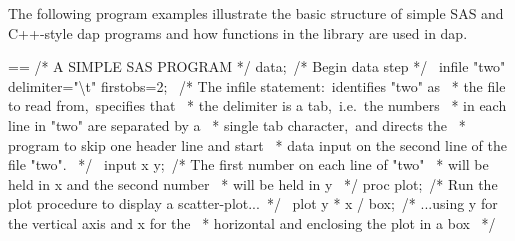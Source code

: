 \documentclass{book}
\makeatletter
\newenvironment{Texinfopreformatted}{%
  \par\GNUTobeylines\obeyspaces\frenchspacing\parskip=\z@\parindent=\z@}{}
{\catcode`\^^M=13 \gdef\GNUTobeylines{\catcode`\^^M=13 \def^^M{\null\par}}}
\newenvironment{Texinfoindented}{\begin{list}{}{}\item\relax}{\end{list}}
\renewcommand{\_}{\Texinfounderscore\discretionary{}{}{}}
\makeatother
\begin{document}
The following program examples illustrate the basic structure
of simple SAS and C++-style dap programs and how functions in the library are used in dap.

\begin{Texinfoindented}
\begin{Texinfopreformatted}%
\ttfamily /* A SIMPLE SAS PROGRAM */
data;\                  /* Begin data step */
\ infile "two" delimiter="\textbackslash{}t" firstobs=2;
\                       /* The infile statement:\ identifies "two" as
\                        * the file to read from,\ specifies that
\                        * the delimiter is a tab,\ i.e.\ the numbers
\                        * in each line in "two" are separated by a
\                        * single tab character,\ and directs the
\                        * program to skip one header line and start
\                        * data input on the second line of the file "two".
\                        */
\ input x y;\            /* The first number on each line of "two"
\                        * will be held in x and the second number
\                        * will be held in y
\                        */
proc plot;\             /* Run the plot procedure to display a scatter-plot...\ */
\ plot y * x / box;\     /* ...using y for the vertical axis and x for the
\                        * horizontal and enclosing the plot in a box
\                        */

\end{Texinfopreformatted}
\end{Texinfoindented}
\end{document}
